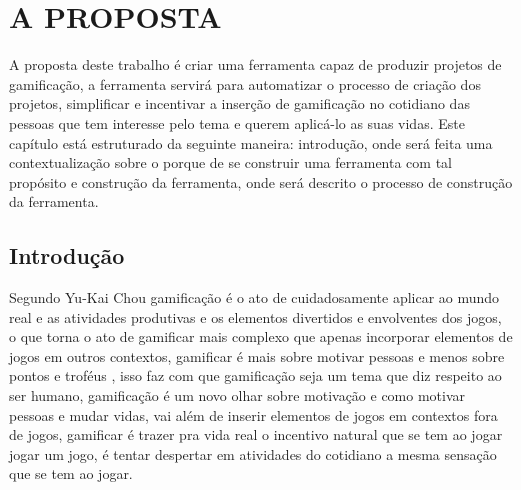 
\chapter[A Proposta]{A PROPOSTA}

A proposta deste trabalho é criar uma ferramenta capaz de produzir projetos de gamificação, a ferramenta servirá para automatizar o processo de criação dos projetos, simplificar e incentivar a inserção de gamificação no cotidiano das pessoas que tem interesse pelo tema e querem aplicá-lo as suas vidas. Este capítulo está estruturado da seguinte maneira: introdução, onde será feita uma contextualização sobre o porque de se construir uma ferramenta com tal propósito e construção da ferramenta, onde será descrito o processo de construção da ferramenta.           

\section{Introdução}

 

Segundo Yu-Kai Chou \cite{chou2015actionable} gamificação é o ato de cuidadosamente aplicar ao mundo real e as atividades produtivas e os elementos divertidos e envolventes dos jogos, o que torna o ato de gamificar mais complexo que apenas incorporar elementos de jogos em outros contextos, gamificar é mais sobre  motivar pessoas e menos sobre pontos e troféus \cite{chou2015actionable}, isso faz com que gamificação seja um tema que diz respeito ao ser humano, gamificação é um novo olhar sobre motivação e como motivar pessoas e mudar vidas, vai além de inserir elementos de jogos em contextos fora de jogos, gamificar é trazer pra vida real o incentivo natural que se tem ao jogar jogar um jogo, é tentar despertar em atividades do cotidiano a mesma sensação que se tem ao jogar.

